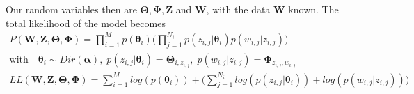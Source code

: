 \documentclass[../../statistical_learning_notes.tex]{subfiles}
\begin{document}
Our random variables then are $\bm{\Theta}, \bm{\Phi}, \bm{Z}$ and $\bm{W}$, with the data $\bm{W}$ known. The total likelihood of the model becomes
\begin{gather*}
    P(\bm{W},\bm{Z},\bm{\Theta}, \bm{\Phi}) = \prod_{i=1}^{M} p(\bm{\theta}_{i}) \bigg(  \prod_{j=1}^{N_{i}} p(z_{i,j}|\bm{\theta}_{i}) p(w_{i,j}|z_{i,j}) \bigg)\\
    \text{with} \quad \bm{\theta}_{i} \sim Dir(\bm{\alpha}), \; p(z_{i,j}|\bm{\theta}_{i}) = \bm{\Theta}_{i,z_{i,j}}, \; p(w_{i,j}|z_{i,j}) = \bm{\Phi}_{z_{i,j},w_{i,j}}\\
    LL(\bm{W},\bm{Z},\bm{\Theta}, \bm{\Phi}) = \sum_{i=1}^{M} log(p(\bm{\theta}_{i})) + \bigg(  \sum_{j=1}^{N_{i}} log(p(z_{i,j}|\bm{\theta}_{i})) + log(p(w_{i,j}|z_{i,j})) \bigg)\\
\end{gather*}
\end{document}

